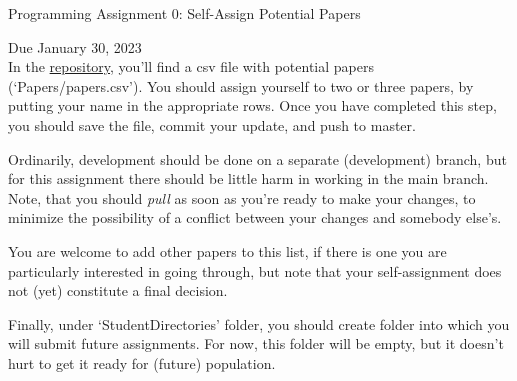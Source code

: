 \documentclass[10pt, a4paper]{article}
\begin{document}


\begin{center}
	\Large Programming Assignment 0: Self-Assign Potential Papers \end{center}
\hspace{5.5in} Due January 30, 2023\\ 

In  the \href{https://github.com/schmidttgenstein/fa23-mlii.git}{repository}, you'll find a csv file with potential papers (`Papers/papers.csv'). You should assign yourself to two or three papers, by putting your name in the appropriate rows. Once you have completed this step, you should save the  file, commit your update, and push to master. 


Ordinarily, development should be done on a separate (development) branch, but for this assignment there should be little harm in working in the main branch. Note, that you should \textit{pull} as soon as you're ready to make your changes, to minimize the possibility of a conflict between your changes and somebody else's. 

You are welcome to add other papers to this list, if there is one you are particularly interested in going through, but note that your self-assignment does not (yet) constitute a final decision.

Finally, under `StudentDirectories' folder, you should create folder into which you will submit future assignments. For now, this folder will be empty, but it doesn't hurt to get it ready for (future) population. 

\noindent 



\end{document}
